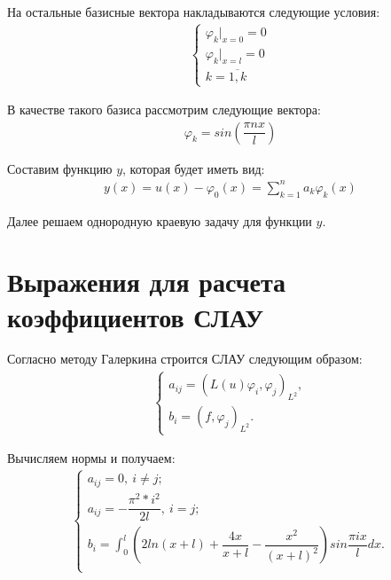 \documentclass[12pt,a4paper,oneside]{extarticle}
\begin{document}
    На остальные базисные вектора накладываются следующие условия:
    \begin{gather}
        \begin{cases}
            \varphi_k|_{x = 0} = 0 \nonumber \\
            \varphi_k|_{x = l} = 0 \nonumber \\
            k = \overline{1, k} \nonumber
        \end{cases}
    \end{gather}
    
    В качестве такого базиса рассмотрим следующие вектора:
    \begin{gather}
        \varphi_k = sin\left( \dfrac{\pi nx}{l} \right) \nonumber
    \end{gather}
    
    Составим функцию $y$, которая будет иметь вид: 
    \begin{gather}
        y(x) = u(x) - \varphi_0(x) = \sum\limits_{k=1}^{n} a_k\varphi_k(x) \nonumber
    \end{gather}

    Далее решаем однородную краевую задачу для функции $y$.

\section{Выражения для расчета коэффициентов СЛАУ}
    Согласно методу Галеркина строится СЛАУ следующим образом:
    \begin{gather}
        \begin{cases}
            a_{ij} = (L(u)\varphi_i,\varphi_j)_{L^2}, \nonumber \\
            b_i = (f,\varphi_j)_{L^2}.
        \end{cases}
    \end{gather}

    Вычисляем нормы и получаем:
    \begin{gather}
        \begin{cases}
            a_{ij} = 0,~ i \neq j;  \nonumber \\
            a_{ij} = -\dfrac{\pi^2*i^2}{2l}, ~i=j;  \nonumber \\
            b_i = \int_0^l (2ln(x+l) + \dfrac{4x}{x+l} - \dfrac{x^2}{(x+l)^2}) sin\dfrac{\pi ix}{l} dx.  \nonumber \\
        \end{cases}
    \end{gather}
    
\end{document}
